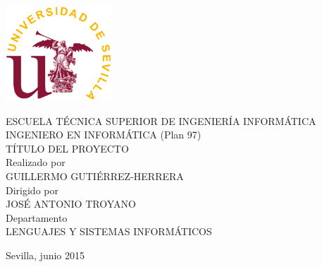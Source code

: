 
\thispagestyle{empty}

\begingroup

\begin{center}
\includegraphics[width=4cm]{logo_us}\\[1.5cm]

\Large

\portadafont

ESCUELA TÉCNICA SUPERIOR DE INGENIERÍA INFORMÁTICA\\[1cm]

INGENIERO EN INFORMÁTICA (Plan 97)\\[3cm]

TÍTULO DEL PROYECTO\\[2.5cm]

Realizado por\\[0.3cm]

GUILLERMO GUTIÉRREZ-HERRERA\\[1cm]

Dirigido por\\[0.3cm]

JOSÉ ANTONIO TROYANO\\[1cm]

Departamento\\[0.3cm]

LENGUAJES Y SISTEMAS INFORMÁTICOS\\[2.5cm]


\end{center}

\begin{flushright}
\portadafont
Sevilla, junio 2015
\end{flushright}

\endgroup

